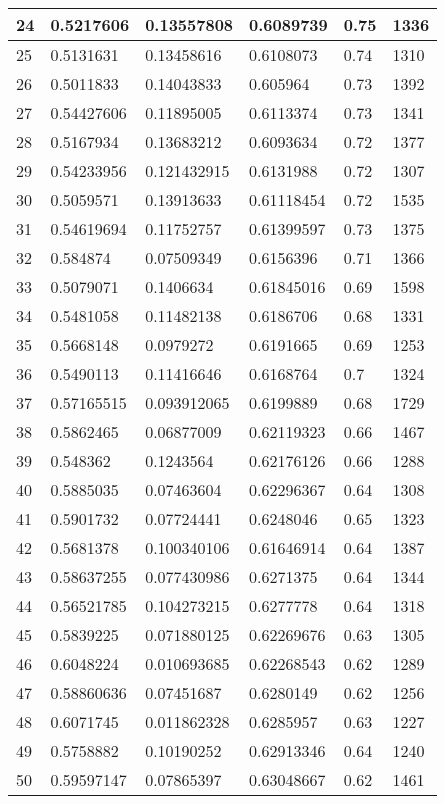 \begin{longtable}{|l|l|l|l|l|l|}
24 & 0.5217606 & 0.13557808 & 0.6089739 & 0.75 & 1336 \\ \hline 
25 & 0.5131631 & 0.13458616 & 0.6108073 & 0.74 & 1310 \\ \hline 
26 & 0.5011833 & 0.14043833 & 0.605964 & 0.73 & 1392 \\ \hline 
27 & 0.54427606 & 0.11895005 & 0.6113374 & 0.73 & 1341 \\ \hline 
28 & 0.5167934 & 0.13683212 & 0.6093634 & 0.72 & 1377 \\ \hline 
29 & 0.54233956 & 0.121432915 & 0.6131988 & 0.72 & 1307 \\ \hline 
30 & 0.5059571 & 0.13913633 & 0.61118454 & 0.72 & 1535 \\ \hline 
31 & 0.54619694 & 0.11752757 & 0.61399597 & 0.73 & 1375 \\ \hline 
32 & 0.584874 & 0.07509349 & 0.6156396 & 0.71 & 1366 \\ \hline 
33 & 0.5079071 & 0.1406634 & 0.61845016 & 0.69 & 1598 \\ \hline 
34 & 0.5481058 & 0.11482138 & 0.6186706 & 0.68 & 1331 \\ \hline 
35 & 0.5668148 & 0.0979272 & 0.6191665 & 0.69 & 1253 \\ \hline 
36 & 0.5490113 & 0.11416646 & 0.6168764 & 0.7 & 1324 \\ \hline 
37 & 0.57165515 & 0.093912065 & 0.6199889 & 0.68 & 1729 \\ \hline 
38 & 0.5862465 & 0.06877009 & 0.62119323 & 0.66 & 1467 \\ \hline 
39 & 0.548362 & 0.1243564 & 0.62176126 & 0.66 & 1288 \\ \hline 
40 & 0.5885035 & 0.07463604 & 0.62296367 & 0.64 & 1308 \\ \hline 
41 & 0.5901732 & 0.07724441 & 0.6248046 & 0.65 & 1323 \\ \hline 
42 & 0.5681378 & 0.100340106 & 0.61646914 & 0.64 & 1387 \\ \hline 
43 & 0.58637255 & 0.077430986 & 0.6271375 & 0.64 & 1344 \\ \hline 
44 & 0.56521785 & 0.104273215 & 0.6277778 & 0.64 & 1318 \\ \hline 
45 & 0.5839225 & 0.071880125 & 0.62269676 & 0.63 & 1305 \\ \hline 
46 & 0.6048224 & 0.010693685 & 0.62268543 & 0.62 & 1289 \\ \hline 
47 & 0.58860636 & 0.07451687 & 0.6280149 & 0.62 & 1256 \\ \hline 
48 & 0.6071745 & 0.011862328 & 0.6285957 & 0.63 & 1227 \\ \hline 
49 & 0.5758882 & 0.10190252 & 0.62913346 & 0.64 & 1240 \\ \hline 
50 & 0.59597147 & 0.07865397 & 0.63048667 & 0.62 & 1461 \\ \hline 
\end{longtable}